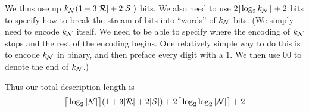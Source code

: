 We thus use up $k_{\mathcal N} (1 + 3 |{\mathcal R}| + 2 |{\mathcal S}|)$ bits. We also need
to use $2 \lceil \log_2 k_{\mathcal N} \rceil + 2$ bits to specify how to
break the stream of bits into ``words'' of $k_{\mathcal N}$ bits. (We simply
need to encode $k_{\mathcal N}$ itself. We need to be able to specify where
the encoding of $k_{\mathcal N}$ stops and the rest of the encoding
begins. One relatively simple way to do this is to encode $k_{\mathcal N}$ in
binary, and then preface every digit with a $1$. We then use $00$ to
denote the end of $k_{\mathcal N}$.)

Thus our total description length is
\begin{align*}
\big\lceil \log_2 |{\mathcal N}| \big\rceil (1 + 3 |{\mathcal R}| + 2|{\mathcal S}|) + 2 \big\lceil
\log_2 \log_2 |{\mathcal N}| \big\rceil + 2
\end{align*}

